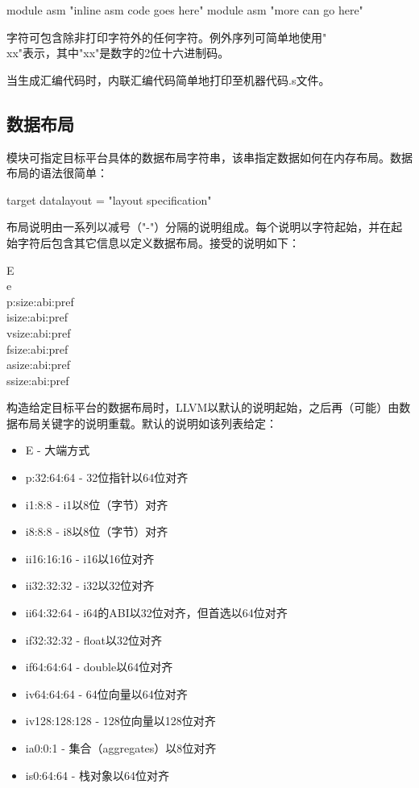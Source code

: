 \documentclass[12pt,a4paper]{article}
\begin{document}
{module asm "inline asm code goes here"
module asm "more can go here"

字符可包含除非打印字符外的任何字符。例外序列可简单地使用"\\xx"表示，其中"xx"是数字的2位十六进制码。

当生成汇编代码时，内联汇编代码简单地打印至机器代码.s文件。

\subsection{数据布局}

模块可指定目标平台具体的数据布局字符串，该串指定数据如何在内存布局。数据布局的语法很简单：

target datalayout = "layout specification"

布局说明由一系列以减号（"-"）分隔的说明组成。每个说明以字符起始，并在起始字符后包含其它信息以定义数据布局。接受的说明如下：

\begin{description}
\item[E]
\item[e]
\item[p:size:abi:pref]
\item[isize:abi:pref]
\item[vsize:abi:pref]
\item[fsize:abi:pref]
\item[asize:abi:pref]
\item[ssize:abi:pref]
\end{description}

构造给定目标平台的数据布局时，LLVM以默认的说明起始，之后再（可能）由数据布局关键字的说明重载。默认的说明如该列表给定：

\begin{itemize}
\item E - 大端方式
\item p:32:64:64 - 32位指针以64位对齐
\item i1:8:8 - i1以8位（字节）对齐
\item i8:8:8 - i8以8位（字节）对齐
\item ii16:16:16 - i16以16位对齐
\item ii32:32:32 - i32以32位对齐
\item ii64:32:64 - i64的ABI以32位对齐，但首选以64位对齐
\item if32:32:32 - float以32位对齐
\item if64:64:64 - double以64位对齐
\item iv64:64:64 - 64位向量以64位对齐
\item iv128:128:128 - 128位向量以128位对齐
\item ia0:0:1 - 集合（aggregates）以8位对齐
\item is0:64:64 - 栈对象以64位对齐
\end{itemize}

}
\end{document}
